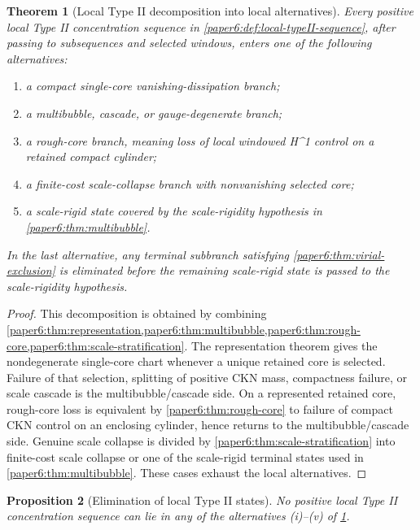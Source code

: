 \documentclass[11pt]{amsart}
\def\({}%
\def\){}%
\theoremstyle{plain}
\newtheorem{theorem}{Theorem}[section]
\newtheorem{proposition}[theorem]{Proposition}
\theoremstyle{definition}
\theoremstyle{remark}
\begin{document}
\begin{theorem}[Local Type II decomposition into local alternatives]
\label{paper6:thm:state-decomposition}
Every positive local Type II concentration sequence in \cref{paper6:def:local-typeII-sequence}, after passing to subsequences and selected windows, enters one of the following alternatives:
\begin{enumerate}[label=\textup{(\roman*)}]
\item a compact single-core vanishing-dissipation branch;
\item a multibubble, cascade, or gauge-degenerate branch;
\item a rough-core branch, meaning loss of local windowed \(H^1\) control on a
retained compact cylinder;
\item a finite-cost scale-collapse branch with nonvanishing selected core;
\item a scale-rigid state covered by the scale-rigidity hypothesis in
\cref{paper6:thm:multibubble}.
\end{enumerate}
In the last alternative, any terminal subbranch satisfying
\cref{paper6:thm:virial-exclusion} is eliminated before the remaining scale-rigid
state is passed to the scale-rigidity hypothesis.
\end{theorem}

\begin{proof}
This decomposition is obtained by combining
\cref{paper6:thm:representation,paper6:thm:multibubble,paper6:thm:rough-core,paper6:thm:scale-stratification}.
The representation theorem gives the nondegenerate single-core chart whenever a
unique retained core is selected.  Failure of that selection, splitting of
positive CKN mass, compactness failure, or scale cascade is the
multibubble/cascade side.  On a represented retained core, rough-core loss is
equivalent by \cref{paper6:thm:rough-core} to failure of compact CKN control on an
enclosing cylinder, hence returns to the multibubble/cascade side.  Genuine
scale collapse is divided by \cref{paper6:thm:scale-stratification} into finite-cost
scale collapse or one of the scale-rigid terminal states used in
\cref{paper6:thm:multibubble}.  These cases exhaust the local alternatives.
\end{proof}

\begin{proposition}[Elimination of local Type II states]
\label{paper6:prop:state-elimination}
No positive local Type II concentration sequence can lie in any of the
alternatives \textup{(i)}--\textup{(v)} of
\cref{paper6:thm:state-decomposition}.
\end{proposition}
\end{document}
